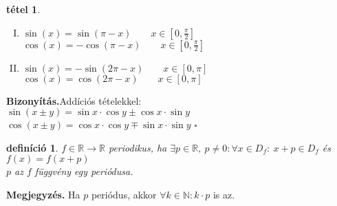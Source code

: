 \documentclass{article}
\newcommand{\ob}{\hfill$\square$}
\newcommand{\R}{\mathbb{R}}
\newcommand{\N}{\mathbb{N}}
\newcommand{\n}{\rightarrow}
\theoremstyle{magyar}
\newtheorem{de}{definíció}[section]
\newtheorem{te}{tétel}[section]
\newenvironment{biz}{\begin{trivlist}\item\relax\mbox{\textbf{Bizonyítás.\enskip}}\ignorespaces}{\ob\end{trivlist}}
\newenvironment{megj}{\begin{trivlist}\item\relax\mbox{\textbf{Megjegyzés.\enskip}}\ignorespaces}{\end{trivlist}}
\begin{document}
  \begin{te}
    \begin{enumerate}[I.]
    \item
      $\sin(x) =  \sin(\pi-x) \qquad x\in [0,\frac{\pi}2]$\\
      $\cos(x) =  -\cos(\pi-x) \qquad x\in [0,\frac{\pi}2]$
    \item
      $\sin(x) =  -\sin(2\pi-x) \qquad x\in [0,\pi]$\\
      $\cos(x) =  \cos(2\pi-x) \qquad x\in [0,\pi]$
    \end{enumerate}
  \end{te}
  \begin{biz}Addíciós tételekkel:\\
    $\sin(x\pm y) = \sin x\cdot\cos y \pm \cos x\cdot\sin y$\\
    $\cos(x\pm y) = \cos x\cdot\cos y \mp \sin x\cdot\sin y$
   \end{biz}
  \begin{de}
    $f\in\R\n\R$ \emph{periodikus}, ha $\exists p\in\R,\ p\neq 0\colon
    \forall x \in D_f\colon\ x+p\in D_f$ és $f(x) = f(x+p)$\\
    $p$ az $f$ függvény egy periódusa.
  \end{de}
  \begin{megj}
    Ha $p$ periódus, akkor $\forall k\in \N\colon k\cdot p$ is az.
  \end{megj}
  \newpage
\end{document}

